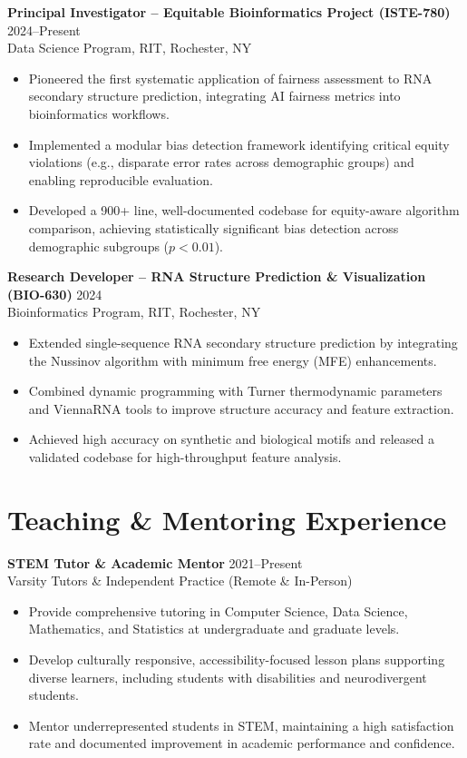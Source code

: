 \documentclass[11pt,letterpaper]{article}
\begin{document}
\textbf{Principal Investigator – Equitable Bioinformatics Project (ISTE-780)} \hfill 2024–Present\\
Data Science Program, RIT, Rochester, NY
\begin{itemize}
    \item Pioneered the first systematic application of fairness assessment to RNA secondary structure prediction, integrating AI fairness metrics into bioinformatics workflows.
    \item Implemented a modular bias detection framework identifying critical equity violations (e.g., disparate error rates across demographic groups) and enabling reproducible evaluation.
    \item Developed a 900+ line, well-documented codebase for equity-aware algorithm comparison, achieving statistically significant bias detection across demographic subgroups (\(p < 0.01\)).
\end{itemize}

\textbf{Research Developer – RNA Structure Prediction \& Visualization (BIO-630)} \hfill 2024\\
Bioinformatics Program, RIT, Rochester, NY
\begin{itemize}
    \item Extended single-sequence RNA secondary structure prediction by integrating the Nussinov algorithm with minimum free energy (MFE) enhancements.
    \item Combined dynamic programming with Turner thermodynamic parameters and ViennaRNA tools to improve structure accuracy and feature extraction.
    \item Achieved high accuracy on synthetic and biological motifs and released a validated codebase for high-throughput feature analysis.
\end{itemize}

\section{Teaching \& Mentoring Experience}

\textbf{STEM Tutor \& Academic Mentor} \hfill 2021–Present\\
Varsity Tutors \& Independent Practice (Remote \& In-Person)
\begin{itemize}
    \item Provide comprehensive tutoring in Computer Science, Data Science, Mathematics, and Statistics at undergraduate and graduate levels.
    \item Develop culturally responsive, accessibility-focused lesson plans supporting diverse learners, including students with disabilities and neurodivergent students.
    \item Mentor underrepresented students in STEM, maintaining a high satisfaction rate and documented improvement in academic performance and confidence.
\end{itemize}
\end{document}

